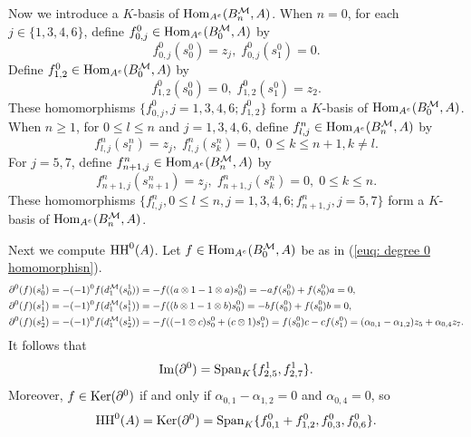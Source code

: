 \documentclass[10pt, reqno]{amsart}
\theoremstyle{definition}
\theoremstyle{remark}
\numberwithin{equation}{section}
\begin{document}
Now we introduce a \(K\)-basis of \(\mathrm{Hom}_{A^e}(B_n^{\mathcal{M}}, A)\). When \(n=0\), for each \(j\in \{1,3,4,6\}\), define  \(f_{0,j}^0 \in \mathrm{Hom}_{A^e}(B_0^{\mathcal{M}}, A)\) by
\[f_{0,j}^0(s_0^0)=z_j,\; f_{0,j}^0(s_1^0)=0. \] 
Define  \(f_{1,2}^0\in \mathrm{Hom}_{A^e}(B_0^{\mathcal{M}}, A) \) by
\[f_{1,2}^0(s_0^0)=0,\; f_{1,2}^0(s_1^0)=z_2. \]
These homomorphisms \( \{f_{0,j}^0, j=1,3,4,6; f_{1,2}^0\}\) form a \(K\)-basis of \(\mathrm{Hom}_{A^e}(B_0^{\mathcal{M}}, A)\).
When \(n\ge 1\), for \(0\le l \le n\) and \(j=1,3,4,6\), define \(f_{l,j}^n\in \mathrm{Hom}_{A^e}(B_n^{\mathcal{M}}, A) \) by
\[f_{l,j}^n(s_l^n)=z_j,\; f_{l,j}^n(s_k^n)=0,\; 0\le k \le n+1, k \neq l. \] 
For \(j=5,7\), define \(f_{n+1,j}^n\in \mathrm{Hom}_{A^e}(B_n^{\mathcal{M}}, A) \) by
\[f_{n+1,j}^n(s_{n+1}^n)=z_j,\; f_{n+1,j}^n(s_k^n)=0,\; 0\le k \le n. \] 
These homomorphisms \(\{f_{l,j}^n, 0\le l \le n, j=1,3,4,6; f_{n+1,j}^n,j=5,7\}\) form a \(K\)-basis of \(\mathrm{Hom}_{A^e}(B_n^{\mathcal{M}}, A)\).

Next we compute \(\mathrm{HH}^0(A) \). Let \(f \in \mathrm{Hom}_{A^e}(B_0^{\mathcal{M}}, A)\) be as in (\ref{euq: degree 0 homomorphisn}). 
\[\begin{aligned}
    & \partial^0(f)(s_0^1) = -(-1)^0f(d_1^{\mathcal{M}}(s_0^1))= -f((a \otimes1 -1\otimes a) s_0^0) =-af(s_0^0)+f(s_0^0)a =0, \\
    & \partial^0(f)(s_1^1)= -(-1)^0f(d_1^{\mathcal{M}}(s_1^1))= -f((b \otimes1 -1\otimes b) s_0^0)= -bf(s_0^0) +f(s_0^0)b=0,\\
    & \partial^0(f)(s_2^1)= -(-1)^0f(d_1^{\mathcal{M}}(s_2^1))= -f((-1\otimes c)s_0^0 +(c \otimes 1)s_1^0)=f(s_0^0)c - cf(s_1^0)= (\alpha_{0,1}- \alpha_{1,2})z_5 +\alpha_{0,4}z_7.
\end{aligned}\]
It follows that
\[ \mathrm{Im}( \partial^0)= \mathrm{Span}_K \{f_{2,5}^1, f_{2,7}^1\}.
\]
Moreover, \(f \in \mathrm{Ker}(\partial^0)\) if and only if \(\alpha_{0,1}-\alpha_{1,2}=0\) and \(\alpha_{0,4}=0\), so
\[\mathrm{HH}^{0}(A)=\mathrm{Ker}(\partial^0)=\mathrm{Span}_K \{f_{0,1}^0+f_{1,2}^0, f_{0,3}^0, f_{0,6}^0\}.
\]
\end{document}
